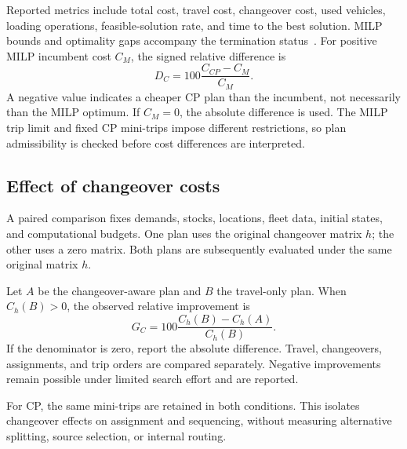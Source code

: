 Reported metrics include total cost, travel cost, changeover cost, used vehicles,
loading operations, feasible-solution rate, and time to the best solution.
MILP bounds and optimality gaps accompany the termination status~\cite{gurobiDocs}.
For positive MILP incumbent cost $C_M$, the signed relative difference is
\[
D_C=100\frac{C_{CP}-C_M}{C_M}.
\]
A negative value indicates a cheaper CP plan than the incumbent, not necessarily
than the MILP optimum. If $C_M=0$, the absolute difference is used. The MILP
trip limit and fixed CP mini-trips impose different restrictions, so plan
admissibility is checked before cost differences are interpreted.

\subsection{Effect of changeover costs}
A paired comparison fixes demands, stocks, locations, fleet data, initial
states, and computational budgets. One plan uses the original changeover
matrix $h$; the other uses a zero matrix. Both plans are subsequently evaluated
under the same original matrix $h$.

Let $A$ be the changeover-aware plan and $B$ the travel-only plan. When
$C_h(B)>0$, the observed relative improvement is
\[
G_C=100\frac{C_h(B)-C_h(A)}{C_h(B)}.
\]
If the denominator is zero, report the absolute difference. Travel, changeovers,
assignments, and trip orders are compared separately. Negative improvements
remain possible under limited search effort and are reported.

For CP, the same mini-trips are retained in both conditions. This isolates
changeover effects on assignment and sequencing, without measuring alternative
splitting, source selection, or internal routing.
